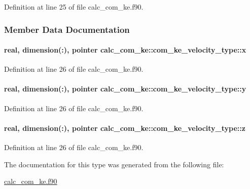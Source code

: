 Definition at line 25 of file calc\-\_\-com\-\_\-ke.\-f90.



\subsubsection{Member Data Documentation}
\hypertarget{structcalc__com__ke_1_1com__ke__velocity__type_afea9c477bf89fedf870adde30f32f435}{
\paragraph[{x}]{\setlength{\rightskip}{0pt plus 5cm}real, dimension(\-:), pointer calc\-\_\-com\-\_\-ke\-::com\-\_\-ke\-\_\-velocity\-\_\-type\-::x}}\label{structcalc__com__ke_1_1com__ke__velocity__type_afea9c477bf89fedf870adde30f32f435}


Definition at line 26 of file calc\-\_\-com\-\_\-ke.\-f90.

\hypertarget{structcalc__com__ke_1_1com__ke__velocity__type_a2a65f47e0cd0fd28fca7af8a6f16b561}{
\paragraph[{y}]{\setlength{\rightskip}{0pt plus 5cm}real, dimension(\-:), pointer calc\-\_\-com\-\_\-ke\-::com\-\_\-ke\-\_\-velocity\-\_\-type\-::y}}\label{structcalc__com__ke_1_1com__ke__velocity__type_a2a65f47e0cd0fd28fca7af8a6f16b561}


Definition at line 26 of file calc\-\_\-com\-\_\-ke.\-f90.

\hypertarget{structcalc__com__ke_1_1com__ke__velocity__type_ab7e84eaa33d0e2aba01ecfff683c0e4b}{
\paragraph[{z}]{\setlength{\rightskip}{0pt plus 5cm}real, dimension(\-:), pointer calc\-\_\-com\-\_\-ke\-::com\-\_\-ke\-\_\-velocity\-\_\-type\-::z}}\label{structcalc__com__ke_1_1com__ke__velocity__type_ab7e84eaa33d0e2aba01ecfff683c0e4b}


Definition at line 26 of file calc\-\_\-com\-\_\-ke.\-f90.



The documentation for this type was generated from the following file\-:\begin{DoxyCompactItemize}
\item 
\hyperlink{calc__com__ke_8f90}{calc\-\_\-com\-\_\-ke.\-f90}\end{DoxyCompactItemize}
